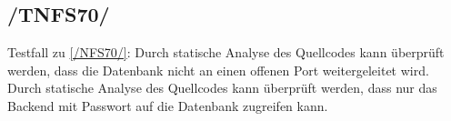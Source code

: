 \subsection*{/TNFS70/}

\label{/TNFS70/} Testfall zu \ref{/NFS70/}: Durch \gls{statische Analyse} des \Gls{Quellcode}s kann überprüft werden, dass die \Gls{Datenbank} nicht an einen offenen \Gls{Port} weitergeleitet wird.
Durch \gls{statische Analyse} des \Gls{Quellcode}s kann überprüft werden, dass nur das \Gls{Backend} mit Passwort auf die \Gls{Datenbank} zugreifen kann.
